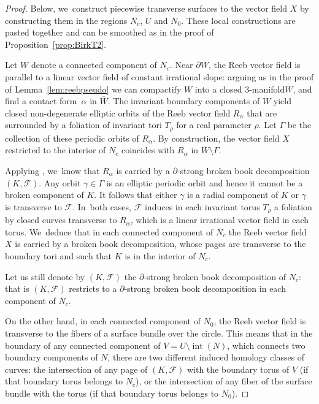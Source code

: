 \documentclass[JEP,XML,SOM,Unicode,NoEqCountersInSection,NoFloatCountersInSection,published]{cedram}
\newcommand{\threemanifold}{$3$\nobreakdash-mani\-fold\xspace}
\theoremstyle{definition}
\begin{document}
\begin{proof}
Below, we~construct piecewise transverse surfaces to the vector field $X$ by constructing them in the regions $N_c$, $U$ and $N_0$. These local constructions are pasted together and can be smoothed as in the proof of Proposition~\ref{prop:BirkT2}.

Let $W$ denote a connected component of $N_c$. Near $\partial W$, the Reeb vector field is parallel to a linear vector field of constant irrational slope: arguing as in the proof of Lemma~\ref{lem:reebpseudo} we can compactify $W$ into a closed \threemanifold $\overline W$, and find a contact form~$\alpha$ in $\overline W$. The invariant boundary components of $W$ yield closed non-degenerate elliptic orbits of the Reeb vector field $R_\alpha$ that are surrounded by a foliation of invariant tori $T_\rho$ for a real parameter $\rho$. Let $\Gamma$ be the collection of these periodic orbits of $R_\alpha$.
By construction, the vector field $X$ restricted to the interior of $N_c$ coincides with $R_\alpha$ in $\overline W \setminus \Gamma$.

Applying \cite[Th.\,1.1]{CDR}, we~know that $R_\alpha$ is carried by a $\partial$-strong broken book decomposition $(K,\mathcal{F})$. Any orbit $\gamma \in \Gamma$ is an elliptic periodic orbit and hence it cannot be a broken component of $K$. It follows that either $\gamma$ is a radial component of $K$ or $\gamma$ is transverse to $\mathcal{F}$. In~both cases, $\mathcal{F}$ induces in each invariant torus $T_\rho$ a foliation by closed curves transverse to $R_\alpha$, which is a linear irrational vector field in each torus. We~deduce that in each connected component of $N_c$ the Reeb vector field $X$ is carried by a broken book decomposition, whose pages are transverse to the boundary tori and such that $K$ is in the interior of $N_c$.

Let us still denote by $(K,\mathcal{F})$ the $\partial$-strong broken book decomposition of $N_c$: that is $(K,\mathcal{F})$ restricts to a $\partial$-strong broken book decomposition in each component of $N_c$.

On the other hand, in each connected component of $N_0$, the Reeb vector field is transverse to the fibers of a surface bundle over the circle. This means that in the boundary of any connected component of $V={U\setminus \operatorname{int}(N)}$, which connects two boundary components of $N$, there are two different induced homology classes of curves: the intersection of any page of $(K,\mathcal{F})$ with the boundary torus of $V$ (if that boundary torus belongs to $N_c$), or the intersection of any fiber of the surface bundle with the torus (if that boundary torus belongs to $N_0$).\enlargethispage{.5\baselineskip}%


\end{proof}
\end{document}
